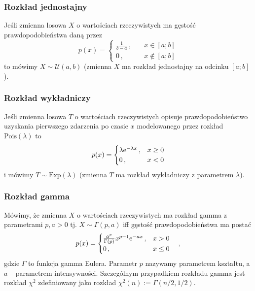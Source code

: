 \documentclass{myclass}
\begin{document}
\subsubsection{Rozkład jednostajny}
Jeśli zmienna losowa \(X\) o wartościach rzeczywistych ma gęstość prawdopodobieństwa daną przez
\begin{equation*}
    p(x) = \begin{cases}
        \frac{1}{b - a}\,,\quad &x \in [a;b]\\
        0\,, &x \notin [a;b]
    \end{cases}
\end{equation*}
to mówimy \(X \sim \mathcal{U}(a,b)\) (zmienna \(X\) ma rozkład jednostajny na odcinku \([a;b]\)).

\subsubsection{Rozkład wykładniczy}
Jeśli zmienna losowa \(T\) o wartościach rzeczywistych opisuje prawdopodobieństwo uzyskania
pierwszego zdarzenia po czasie \(x\) modelowanego przez rozkład \(\text{Pois}(\lambda)\) to
\begin{equation*}
    p(x) = \begin{cases}
        \lambda \mathrm{e}^{-\lambda x}\,, &x \geq 0\\
        0\,, &x < 0 
    \end{cases}
\end{equation*}
i mówimy \(T \sim \text{Exp}(\lambda)\) (zmienna \(T\) ma rozkład wykładniczy z parametrem
\(\lambda\)).

\subsubsection{Rozkład gamma}
Mówimy, że zmienna \(X\) o wartościach rzeczywistych ma rozkład gamma z parametrami \(p, a > 0\) tj.
\(X \sim \Gamma(p, a)\) iff gęstość prawdopodobieństwa ma postać
\begin{equation*}
    p(x) = \begin{cases}
        \frac{a^p}{\Gamma(p)}x^{p-1}\mathrm{e}^{-ax}\,, &x > 0\\
        0\,, &x \leq 0
    \end{cases}\quad,
\end{equation*}
gdzie \(\Gamma\) to funkcja gamma Eulera. Parametr \(p\) nazywamy parametrem kształtu, a \(a\) --
parametrem intensywności. Szczególnym przypadkiem rozkładu gamma jest rozkład \(\chi^2\)
zdefiniowany jako rozkład \(\chi^2(n) := \Gamma(n/2, 1/2)\).
\end{document}
